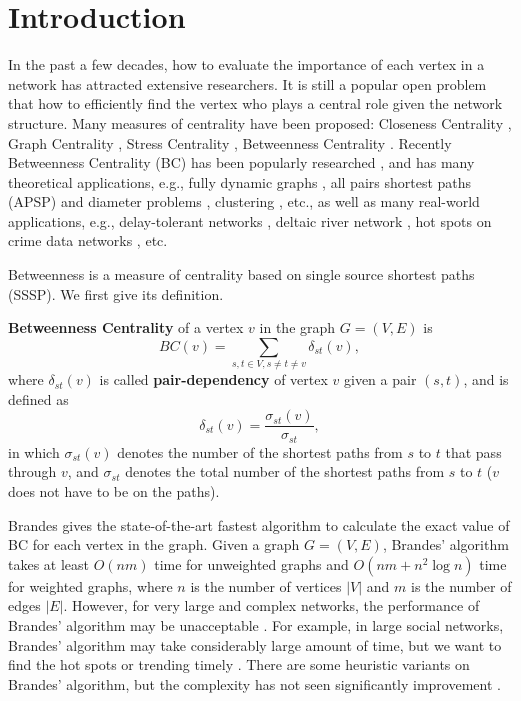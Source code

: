 \documentclass[10pt]{article}
\begin{document}
\section{Introduction}
In the past a few decades, how to evaluate the importance of each vertex in a network has attracted extensive researchers. It is still a popular open problem that how to efficiently find the vertex who plays a central role given the network structure. Many measures of centrality have been proposed: Closeness Centrality \cite{sabidussi1966centrality}, Graph Centrality \cite{hage1995eccentricity}, Stress Centrality \cite{shimbel1953structural}, Betweenness Centrality \cite{freeman1977set}. Recently Betweenness Centrality (BC) has been popularly researched \cite{bader2007approximating, brandes2008variants, abboud2015subcubic}, and has many theoretical applications, e.g., fully dynamic graphs \cite{lee2016efficient}, all pairs shortest paths (APSP) and diameter problems \cite{abboud2015subcubic}, clustering \cite{fairbanks2015behavioral}, etc., as well as many real-world applications, e.g., delay-tolerant networks \cite{magaia2015betweenness}, deltaic river network \cite{cui2015assessment}, hot spots on crime data networks \cite{sivaranjani2015mitigating}, etc.

Betweenness is a measure of centrality based on single source shortest paths (SSSP). We first give its definition.
\begin{definition}
\label{def:bc}
{\bf Betweenness Centrality} \cite{freeman1977set, brandes2001faster, bader2007approximating} of a vertex $v$ in the graph $G=(V,E)$ is
\begin{equation}
BC(v) = \sum_{s,t\in V, s\not=t\not=v} \delta_{st}(v),
\end{equation}
where $\delta_{st}(v)$ is called {\bf pair-dependency} of vertex $v$ given a pair $(s,t)$, and is defined as
\begin{equation}
\delta_{st}(v) = \frac{\sigma_{st}(v)}{\sigma_{st}},
\end{equation}
in which $\sigma_{st}(v)$ denotes the number of the shortest paths from $s$ to $t$ that pass through $v$, and $\sigma_{st}$ denotes the total number of the shortest paths from $s$ to $t$ ($v$ does not have to be on the paths).
\end{definition}
Brandes \cite{brandes2001faster, brandes2008variants} gives the state-of-the-art fastest algorithm to calculate the exact value of BC for each vertex in the graph. Given a graph $G=(V, E)$, Brandes' algorithm takes at least $O(nm)$ time for unweighted graphs and $O(nm + n^2 \log n)$ time for weighted graphs, where $n$ is the number of vertices $|V|$ and $m$ is the number of edges $|E|$. However, for very large and complex networks, the performance of Brandes' algorithm may be unacceptable \cite{bader2007approximating}. For example, in large social networks, Brandes' algorithm may take considerably large amount of time, but we want to find the hot spots or trending timely \cite{kourtellis2013identifying}. There are some heuristic variants on Brandes' algorithm, but the complexity has not seen significantly improvement \cite{puzis2012heuristics}. 
\end{document}
